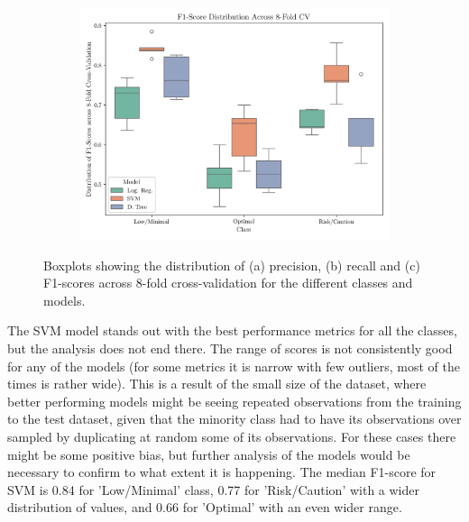 \documentclass[conference]{IEEEtran}
\begin{document}
\begin{figure}[H]
    \ContinuedFloat
    \vspace{0.05cm}

    \begin{subfigure}[1]{\linewidth}
        \centering
        \includegraphics[width=0.95\linewidth]{assets/box_f1score.png}
        \caption{ }
        \label{box_f1score}
    \end{subfigure}
    
    \caption{Boxplots showing the distribution of (a) precision, (b) recall and (c) F1-scores across 8-fold cross-validation for the different classes and models.}
    \label{box_plots1}
\end{figure} %

The SVM model stands out with the best performance metrics for all the classes, but the analysis does not end there. The range of scores is not consistently good for any of the models (for some metrics it is narrow with few outliers, most of the times is rather wide). This is a result of the small size of the dataset, where better performing models might be seeing repeated observations from the training to the test dataset, given that the minority class had to have its observations over sampled by duplicating at random some of its observations. For these cases there might be some positive bias, but further analysis of the models would be necessary to confirm to what extent it is happening. The median F1-score for SVM is 0.84 for 'Low/Minimal' class, 0.77 for 'Risk/Caution' with a wider distribution of values, and 0.66 for 'Optimal' with an even wider range. 
\end{document}
